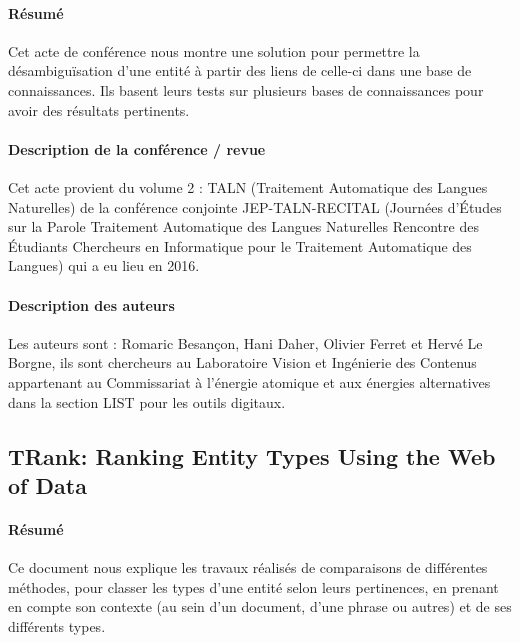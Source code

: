 \documentclass{article}
\begin{document}
\paragraph{Résumé}

Cet acte de conférence nous montre une solution pour permettre la désambiguïsation d'une entité à partir des liens de celle-ci dans une base de connaissances. Ils basent leurs tests sur plusieurs bases de connaissances pour avoir des résultats pertinents.


\paragraph{Description de la conférence / revue}

Cet acte provient du volume 2 : TALN (Traitement Automatique des Langues Naturelles) de la conférence conjointe JEP-TALN-RECITAL (Journées d’Études sur la Parole Traitement Automatique des Langues Naturelles Rencontre des Étudiants Chercheurs en Informatique pour le Traitement Automatique des Langues) qui a eu lieu en 2016.


\paragraph{Description des auteurs}

Les auteurs sont : Romaric Besançon, Hani Daher, Olivier Ferret et Hervé Le Borgne, ils sont chercheurs au Laboratoire Vision et Ingénierie des Contenus appartenant au Commissariat à l'énergie atomique et aux énergies alternatives dans la section LIST pour les outils digitaux.

\subsection{TRank: Ranking Entity Types Using the Web of Data\cite{article-12}}

\paragraph{Résumé}

Ce document nous explique les travaux réalisés de comparaisons de différentes méthodes, pour classer les types d'une entité selon leurs pertinences, en prenant en compte son contexte (au sein d'un document, d'une phrase ou autres) et de ses différents types.
\end{document}
